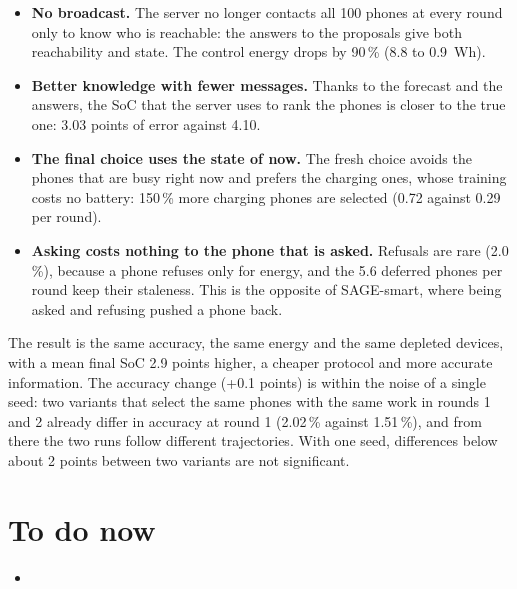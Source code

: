 \documentclass[11pt,a4paper]{article}
\begin{document}
\begin{itemize}
  \item \textbf{No broadcast.} The server no longer contacts all 100 phones at
        every round only to know who is reachable: the answers to the proposals
        give both reachability and state. The control energy drops by 90\,\%
        (8.8 to \SI{0.9}{Wh}).
  \item \textbf{Better knowledge with fewer messages.} Thanks to the forecast
        and the answers, the SoC that the server uses to rank the phones is
        closer to the true one: 3.03 points of error against 4.10.
  \item \textbf{The final choice uses the state of now.} The fresh choice
        avoids the phones that are busy right now and prefers the charging ones,
        whose training costs no battery: 150\,\% more charging phones are
        selected (0.72 against 0.29 per round).
  \item \textbf{Asking costs nothing to the phone that is asked.} Refusals are
        rare (2.0\,\%), because a phone refuses only for energy, and the 5.6
        deferred phones per round keep their staleness. This is the opposite of
        SAGE-smart, where being asked and refusing pushed a phone back.
\end{itemize}
The result is the same accuracy, the same energy and the same depleted
devices, with a mean final SoC 2.9 points higher, a cheaper protocol and more
accurate information. The accuracy change (+0.1 points) is within the noise of a single seed: two variants that select the same phones
with the same work in rounds 1 and 2 already differ in accuracy at round 1
(2.02\,\% against 1.51\,\%), and from there the two runs follow different
trajectories. With one seed, differences below about 2 points between two
variants are not significant.

\section{To do now}
\begin{itemize}
    \item 
\end{itemize}
\end{document}
